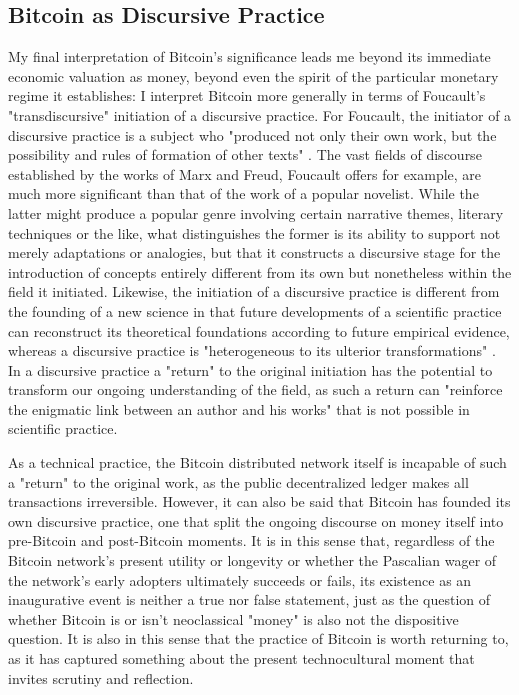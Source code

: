 \subsection*{Bitcoin as Discursive Practice}
My final interpretation of Bitcoin's significance leads me beyond its immediate economic valuation as money, beyond even the spirit of the particular monetary regime it establishes: I interpret Bitcoin more generally in terms of Foucault's "transdiscursive" initiation of a discursive practice. For Foucault, the initiator of a discursive practice is a subject who "produced not only their own work, but the possibility and rules of formation of other texts" \autocite*[131]{FoucaultAuthor}. The vast fields of discourse established by the works of Marx and Freud, Foucault offers for example, are much more significant than that of the work of a popular novelist. While the latter might produce a popular genre involving certain narrative themes, literary techniques or the like, what distinguishes the former is its ability to support not merely adaptations or analogies, but that it constructs a discursive stage for the introduction of concepts entirely different from its own but nonetheless within the field it initiated. Likewise, the initiation of a discursive practice is different from the founding of a new science in that future developments of a scientific practice can reconstruct its theoretical foundations according to future empirical evidence, whereas a discursive practice is "heterogeneous to its ulterior transformations" \autocite[133]{FoucaultAuthor}. In a discursive practice a "return" to the original initiation has the potential to transform our ongoing understanding of the field, as such a return can "reinforce the enigmatic link between an author and his works" \autocite[136]{FoucaultAuthor} that is not possible in scientific practice.

As a technical practice, the Bitcoin distributed network itself is incapable of such a "return" to the original work, as the public decentralized ledger makes all transactions irreversible. However, it can also be said that Bitcoin has founded its own discursive practice, one that split the ongoing discourse on money itself into pre-Bitcoin and post-Bitcoin moments. It is in this sense that, regardless of the Bitcoin network's present utility or longevity or whether the Pascalian wager of the network's early adopters ultimately succeeds or fails, its existence as an inaugurative event is neither a true nor false statement, just as the question of whether Bitcoin is or isn't neoclassical "money" is also not the dispositive question. It is also in this sense that the practice of Bitcoin is worth returning to, as it has captured something about the present technocultural moment that invites scrutiny and reflection.

